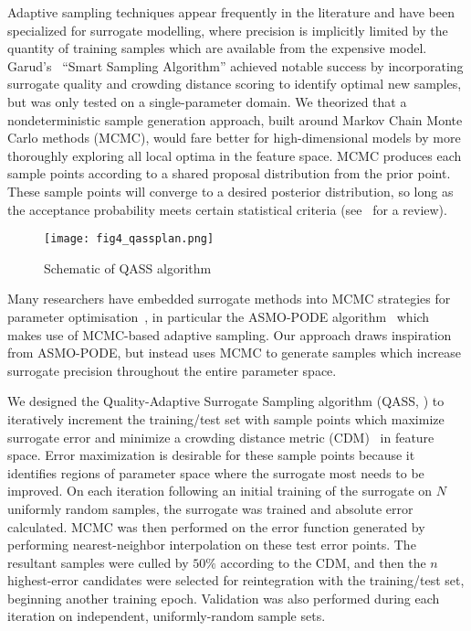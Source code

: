 Adaptive sampling techniques appear frequently in the literature and have been
specialized for surrogate modelling, where precision is implicitly limited by the quantity of training samples which are available from the expensive model. Garud's~\cite{Garud2016} ``Smart Sampling Algorithm'' achieved notable success by incorporating surrogate quality and
crowding distance scoring to identify optimal new samples, but was only tested
on a single-parameter domain. We theorized that a nondeterministic sample
generation approach, built around Markov Chain Monte Carlo methods (MCMC), would
fare better for high-dimensional models by more thoroughly exploring all local
optima in the feature space. MCMC produces each sample points according to a shared proposal
distribution from the prior point. These sample points will converge to a desired posterior
distribution, so long as the acceptance probability meets certain statistical criteria (see~\cite{Zhou2018} for a review).

\begin{figure}
	\centering
	\hspace*{-5pt}\texttt{[image: fig4\_qassplan.png]}
	\caption{\label{fig:qassplan}Schematic of QASS algorithm}
\end{figure}

Many researchers have embedded surrogate methods into MCMC strategies for
parameter optimisation~\cite{Zhang2020,Gong2017}, in particular the ASMO-PODE
algorithm~\cite{Ginting2011} which makes use of MCMC-based adaptive sampling. Our approach draws inspiration from ASMO-PODE, but instead uses MCMC to generate samples
which increase surrogate precision throughout the entire parameter space.

We designed the Quality-Adaptive Surrogate Sampling algorithm (QASS, ) to iteratively increment the training/test set with sample
points which maximize surrogate error and minimize a crowding distance metric
(CDM)~\cite{Solonen2012} in feature space. Error maximization is desirable for these sample points because it identifies regions of parameter space where the surrogate most needs to be improved. On each iteration following an initial training of the surrogate on $N$ uniformly random samples, the surrogate was trained and absolute error calculated. MCMC was then performed on the error function generated by performing nearest-neighbor interpolation on these test error points. The resultant samples were culled by $50\%$ according to the CDM, and then the $n$ highest-error candidates were selected for reintegration with the training/test set, beginning another training epoch. Validation was also performed during each iteration on independent, uniformly-random sample sets.
